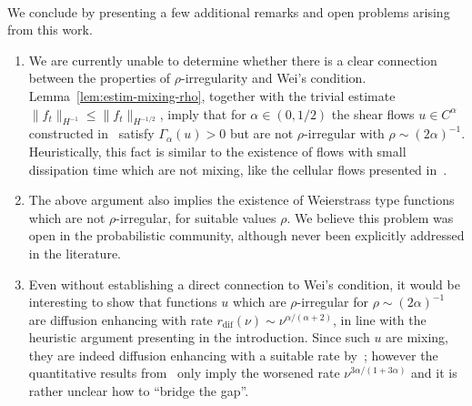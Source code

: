 \documentclass[11pt,oneside,reqno]{amsart}
\newenvironment{enumeratenumeric}{\begin{enumerate}[1.] }{\end{enumerate}}
\numberwithin{equation}{section}
\begin{document}
\

We conclude by presenting a few additional remarks and open problems arising
from this work.
\begin{enumeratenumeric}
  \item We are currently unable to determine whether there is a clear
  connection between the properties of $\rho$-irregularity and Wei's
  condition. Lemma~\ref{lem:estim-mixing-rho}, together with the trivial
  estimate $\| f_t \|_{H^{- 1}} \leqslant \| f_t \|_{H^{- 1 / 2}}$, imply that
  for $\alpha \in (0, 1 / 2)$ the shear flows $u \in C^{\alpha}$ constructed
  in~{\cite{colombozelati}} satisfy $\Gamma_{\alpha} (u) > 0$ but are not
  $\rho$-irregular with $\rho \sim (2 \alpha)^{- 1}$. Heuristically, this fact
  is similar to the existence of flows with small dissipation time which are
  not mixing, like the cellular flows presented in~{\cite{iyer2021}}.
  
  \item The above argument also implies the existence of Weierstrass type
  functions which are not $\rho$-irregular, for suitable values $\rho$. We
  believe this problem was open in the probabilistic community, although never
  been explicitly addressed in the literature.
  
  \item Even without establishing a direct connection to Wei's condition, it
  would be interesting to show that functions $u$ which are $\rho$-irregular
  for $\rho \sim (2 \alpha)^{- 1}$ are diffusion enhancing with rate
  $r_{\text{dif}} (\nu) \sim \nu^{\alpha / (\alpha + 2)}$, in
  line with the heuristic argument presenting in the introduction. Since such
  $u$ are mixing, they are indeed diffusion enhancing with a suitable rate
  by~{\cite{constantin2008}}; however the quantitative results
  from~{\cite{zelati2020relation}} only imply the worsened rate $\nu^{3 \alpha
  / (1 + 3 \alpha)}$ and it is rather unclear how to ``bridge the gap''.
  

\end{enumeratenumeric}
\end{document}
